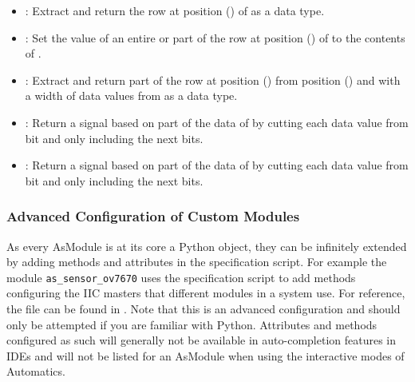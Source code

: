 \begin{itemize}
\item {}: Extract and return the row at position () of  as a  data type.
\item {}: Set the value of an entire or part of the row at position () of  to the contents of .
\item {}:  Extract and return part of the row at position () from position () and with a width of  data values from  as a  data type.
\item {}: Return a  signal based on part of the data of  by cutting each data value from  bit  and only including the next  bits.
\item {}: Return a  signal based on part of the data of  by cutting each data value from  bit  and only including the next  bits.
\end{itemize}

\subsubsection{Advanced Configuration of Custom Modules}
\label{sec:06-02-advanced_spec_scripts}

As every AsModule is at its core a Python object, they can be infinitely extended by adding methods and attributes in the specification script.
For example the module \texttt{as\_sensor\_ov7670} uses the specification script to add methods configuring the IIC masters that different modules in a system use.
For reference, the file can be found in .
Note that this is an advanced configuration and should only be attempted if you are familiar with Python.
Attributes and methods configured as such will generally not be available in auto-completion features in IDEs and will not be listed for an AsModule when using the interactive modes of Automatics.


